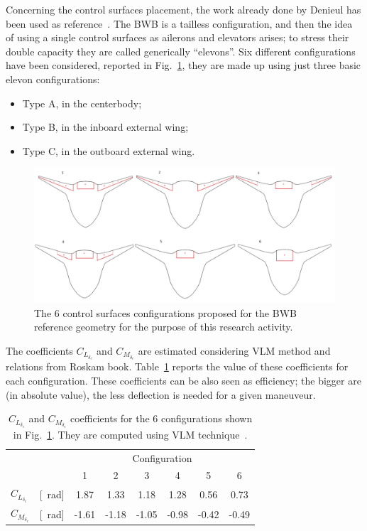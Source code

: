 Concerning the control surfaces placement, the work already done by Denieul has been used as reference~\cite{bib:denieul}.
The BWB is a tailless configuration, and then the idea of using a single control surfaces as ailerons and elevators arises; to stress their double capacity they are called generically ``elevons''. 
Six different configurations have been considered, reported in Fig.~\ref{fig:bwb_elevon_configuration}, they are made up using just three basic elevon configurations:
\begin{itemize}
	\item Type A, in the centerbody;
	\item Type B, in the inboard external wing;
	\item Type C, in the outboard external wing. 
\end{itemize}
\begin{figure}[!h]
	\centering
	\includegraphics[keepaspectratio, width=\textwidth]{images/chap4/bwb_elevons_configuration.jpg}
	\caption{The 6 control surfaces configurations proposed for the BWB reference geometry for the purpose of this research activity.}
	\label{fig:bwb_elevon_configuration}
\end{figure}

The coefficients $C_{L_{\delta_{e}}}$ and $C_{M_{\delta_{e}}}$ are estimated considering VLM method and relations from Roskam book.
Table~\ref{tab:aero_coeff_elevon_conf} reports the value of these coefficients for each configuration. 
These coefficients can be also seen as efficiency; the bigger are (in absolute value), the less deflection is needed for a given maneuveur.
\begin{table}[!h]
	\centering
	\begin{tabular}{l l c c c c c c}
		\cline{3-8}
		& & \multicolumn{6}{c}{Configuration} \\
		& & 1 & 2 & 3 & 4 & 5 & 6 \\
		\hline
		$C_{L_{\delta_{e}}}$ & [\si{\per\radian}] & 1.87 & 1.33 & 1.18 & 1.28 & 0.56 & 0.73 \\
		$C_{M_{\delta_{e}}}$ & [\si{\per\radian}] & -1.61 & -1.18 & -1.05 & -0.98 & -0.42 & -0.49 \\
		\hline
	\end{tabular}
	\caption{$C_{L_{\delta_{e}}}$ and $C_{M_{\delta_{e}}}$ coefficients for the 6 configurations shown in Fig.~\ref{fig:bwb_elevon_configuration}. They are computed using VLM technique~\cite{bib:avl}.}
	\label{tab:aero_coeff_elevon_conf}
\end{table}


